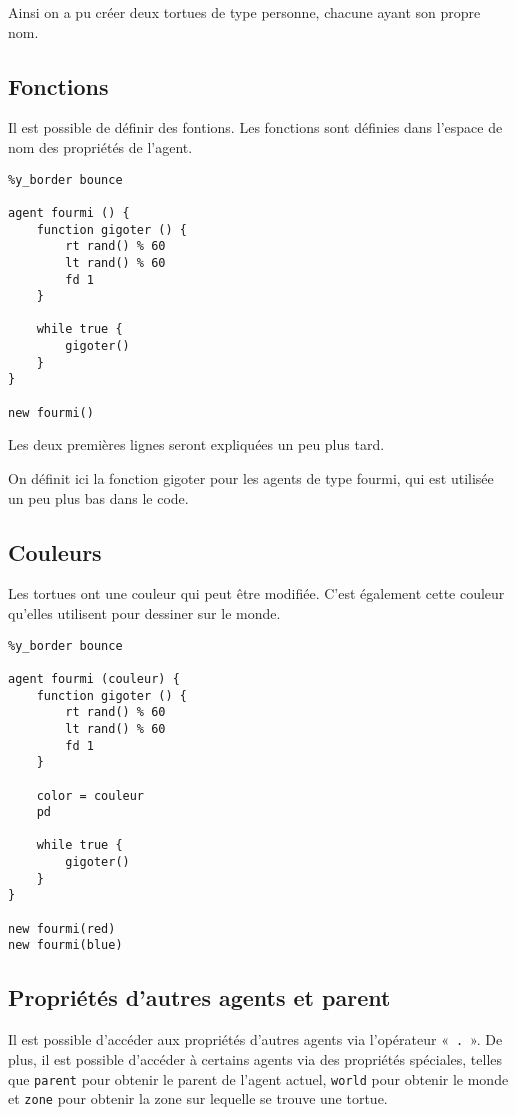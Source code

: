 Ainsi on a pu créer deux tortues de type personne, chacune ayant son propre nom.

\subsection{Fonctions}

Il est possible de définir des fontions. Les fonctions sont définies dans l'espace de nom des propriétés de l'agent.

\begin{lstlisting}[language=Stibbons]
%x_border bounce
%y_border bounce

agent fourmi () {
    function gigoter () {
        rt rand() % 60
        lt rand() % 60
        fd 1
    }

    while true {
        gigoter()
    }
}

new fourmi()
\end{lstlisting}

Les deux premières lignes seront expliquées un peu plus tard.

On définit ici la fonction gigoter pour les agents de type fourmi, qui est utilisée un peu plus bas dans le code.

\subsection{Couleurs}

Les tortues ont une couleur qui peut être modifiée. C'est également cette couleur qu'elles utilisent pour dessiner sur le monde.

\begin{lstlisting}[language=Stibbons]
%x_border bounce
%y_border bounce

agent fourmi (couleur) {
    function gigoter () {
        rt rand() % 60
        lt rand() % 60
        fd 1
    }

    color = couleur
    pd

    while true {
        gigoter()
    }
}

new fourmi(red)
new fourmi(blue)
\end{lstlisting}

\subsection{Propriétés d'autres agents et parent}

Il est possible d'accéder aux propriétés d'autres agents via l'opérateur «~\verb|.|~». De plus, il est possible d'accéder à certains agents via des propriétés spéciales, telles que \verb|parent| pour  obtenir le parent de l'agent actuel, \verb|world| pour obtenir le monde et \verb|zone| pour obtenir la zone sur lequelle se trouve une tortue.

